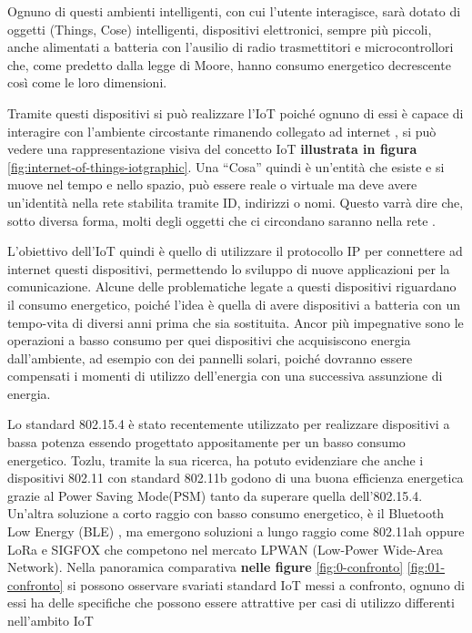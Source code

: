 Ognuno di questi ambienti intelligenti, con cui l'utente interagisce, sarà dotato di oggetti (Things, Cose) intelligenti, dispositivi elettronici, sempre più piccoli, anche alimentati a batteria con l'ausilio di radio trasmettitori e microcontrollori che, come predetto dalla legge di Moore, hanno consumo energetico decrescente così come le loro dimensioni.

Tramite questi dispositivi si può realizzare l’IoT poiché ognuno di essi è capace di interagire con l’ambiente circostante rimanendo collegato ad internet \cite{ashton2009internet} \cite{swan2012sensor}, si può vedere una rappresentazione visiva del concetto IoT\textbf { illustrata in figura} \ref{fig:internet-of-things-iotgraphic}. %
Una “Cosa” quindi è un’entità che esiste e si muove nel tempo e nello spazio, può essere reale o virtuale ma deve avere un'identità nella rete stabilita tramite ID, indirizzi o nomi\cite{SINTEF+S13363}. %
Questo varrà dire che, sotto diversa forma, molti degli oggetti che ci circondano saranno nella rete \cite{gubbi2013internet}.

L’obiettivo dell’IoT quindi è quello di utilizzare il protocollo IP per connettere ad internet questi dispositivi, permettendo lo sviluppo di nuove applicazioni per la comunicazione. Alcune delle problematiche legate a questi dispositivi riguardano il consumo energetico, poiché l’idea è quella di avere dispositivi a batteria con un tempo-vita di diversi anni prima che sia sostituita. Ancor più impegnative sono le operazioni a basso consumo per quei dispositivi che acquisiscono energia dall’ambiente, ad esempio con dei pannelli solari, poiché dovranno essere compensati i momenti di utilizzo dell’energia con una successiva assunzione di energia\cite{morin2017comparison}.

Lo standard 802.15.4 è stato recentemente utilizzato per realizzare dispositivi a bassa potenza\cite{ieee2003ieee} essendo progettato appositamente per un basso consumo energetico. Tozlu, tramite la sua ricerca\cite{5982548}, ha potuto evidenziare che anche i dispositivi 802.11 con standard 802.11b godono di una buona efficienza energetica grazie al Power Saving Mode(PSM)\cite{ieee1999part11} tanto da superare quella dell’802.15.4. Un'altra soluzione a corto raggio con basso consumo energetico, è il Bluetooth Low Energy (BLE) \cite{Bluetooth502016}, ma emergono soluzioni a lungo raggio come 802.11ah \cite{7558107} oppure LoRa \cite{LoRa2017} e SIGFOX \cite{SIGFOX2017} che competono nel mercato LPWAN (Low-Power Wide-Area Network). Nella panoramica comparativa \textbf {nelle figure} \ref{fig:0-confronto} \ref{fig:01-confronto} si possono osservare svariati standard IoT messi a confronto, ognuno di essi ha delle specifiche che possono essere attrattive per casi di utilizzo differenti nell'ambito IoT

